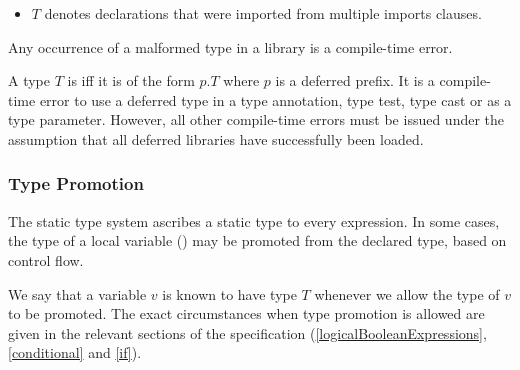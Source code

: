 \documentclass[makeidx]{article}
\begin{document}
{\begin{itemize}

  \noindent
  or of the form



  \noindent
  where each $x_j$ which is not a named parameter may be omitted,
  and $T_j$ is malformed for some $j \in 0 .. n$,
  or $B_j$ is malformed for some $j \in 1 .. m$.
\item
  $T$ denotes declarations that were imported from multiple imports clauses.
\end{itemize}

\LMHash{}%
Any occurrence of a malformed type in a library is a compile-time error.

\LMHash{}%
A type $T$ is 
if{}f it is of the form $p.T$ where $p$ is a deferred prefix.
It is a compile-time error to use a deferred type
in a type annotation, type test, type cast or as a type parameter.
However, all other compile-time errors must be issued
under the assumption that all deferred libraries have successfully been loaded.



\subsubsection{Type Promotion}

\LMHash{}%
The static type system ascribes a static type to every expression.
In some cases, the type of a local variable ()
may be promoted from the declared type, based on control flow.

\LMHash{}%
We say that a variable $v$ is known to have type $T$ whenever we allow the type of $v$ to be promoted.
The exact circumstances when type promotion is allowed are given in the relevant sections of the specification (\ref{logicalBooleanExpressions}, \ref{conditional} and \ref{if}).

}
\end{document}
